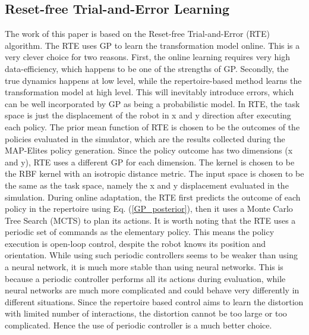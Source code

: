 \documentclass[journal]{IEEEtran}
\begin{document}
\subsection{Reset-free Trial-and-Error Learning}
The work of this paper is based on the Reset-free Trial-and-Error \cite{RTE} (RTE) algorithm. 
The RTE uses GP to learn the transformation model online.
This is a very clever choice for two reasons.
First, the online learning requires very high data-efficiency, which happens to be one of the strengths of GP. 
Secondly, the true dynamics happens at low level, while the repertoire-based method learns the transformation model at high level. This will inevitably introduce errors, which can be well incorporated by GP as being a probabilistic model.
In RTE, the task space is just the displacement of the robot in x and y direction after executing each policy.
The prior mean function of RTE is chosen to be the outcomes of the policies evaluated in the simulator, which are the results collected during the MAP-Elites policy generation. 
Since the policy outcome has two dimensions (x and y), RTE uses a different GP for each dimension.
The kernel is chosen to be the RBF kernel with an isotropic distance metric. The input space is chosen to be the same as the task space, namely the x and y displacement evaluated in the simulation. 
During online adaptation, the RTE first predicts the outcome of each policy in the repertoire using Eq. (\ref{GP_posterior}), then it uses a Monte Carlo Tree Search \cite{MCTS} (MCTS) to plan its actions.
It is worth noting that the RTE uses a periodic set of commands as the elementary policy. 
This means the policy execution is open-loop control, despite the robot knows its position and orientation.
While using such periodic controllers seems to be weaker than using a neural network, it is much more stable than using neural networks. 
This is because a periodic controller performs all its actions during evaluation, while neural networks are much more complicated and could behave very differently in different situations.
Since the repertoire based control aims to learn the distortion with limited number of interactions, the distortion cannot be too large or too complicated. Hence the use of periodic controller is a much better choice. 
\end{document}
